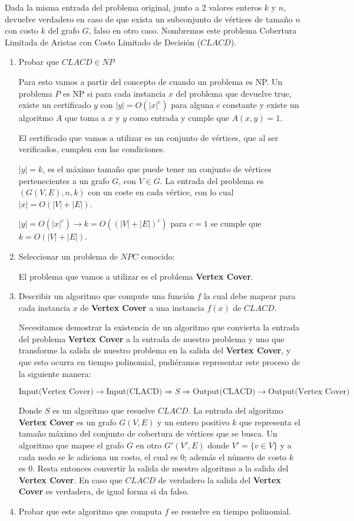 \documentclass{article}
\begin{document}
Dada la misma entrada del problema original, junto a 2 valores enteros $k$ y $n$, devuelve verdadero en caso de que exista un subconjunto de vértices de tamaño $n$ con costo $k$ del grafo $G$, falso en otro caso. Nombremos este problema Cobertura Limitada de Aristas con Costo Limitado de Decisión ($CLACD$).

\begin{enumerate}
  \item Probar que $CLACD \in NP$

    Para esto vamos a partir del concepto de cuando un problema es NP. Un problema $P$ es NP si para cada instancia $x$ del problema que devuelve true, existe un certificado $y$ con $|y|=O(|x|^c)$ para alguna $c$ constante y existe un algoritmo $A$ que toma a $x$ y $y$ como entrada y cumple que $A(x,y) = 1$.

    El certificado que vamos a utilizar es un conjunto de vértices, que al ser verificados, cumplen con las condiciones.

    $|y|=k$, es el máximo tamaño que puede tener un conjunto de vértices pertenecientes a un grafo $G$, con $V \in G$. La entrada del problema es $(G(V,E),n,k)$ con un coste en cada vértice, con lo cual $|x| = O(|V|+|E|)$.

    $|y|=O(|x|^c) \rightarrow k = O((|V|+|E|)^c)$ para $c=1$ se cumple que $k=O(|V|+|E|)$.
  \item Seleccionar un problema de $NPC$ conocido:

    El problema que vamos a utilizar es el problema \textbf{Vertex Cover}.
  \item Describir un algoritmo que compute una función $f$ la cual debe mapear para cada instancia $x$ de \textbf{Vertex Cover} a una instancia $f(x)$ de $CLACD$.

    Necesitamos demostrar la existencia de un algoritmo que convierta la entrada del problema \textbf{Vertex Cover} a la entrada de nuestro problema y uno que transforme la salida de nuestro problema en la salida del \textbf{Vertex Cover}, y que esto ocurra en tiempo polinomial, pudiéramos representar este proceso de la siguiente manera:

    \[
    \text{Input(Vertex Cover)} \rightarrow \text{Input(CLACD)} \Longrightarrow S \Longrightarrow \text{Output(CLACD)} \rightarrow \text{Output(Vertex Cover)}
    \]

    Donde $S$ es un algoritmo que resuelve $CLACD$. La entrada del algoritmo \textbf{Vertex Cover} es un grafo $G(V,E)$ y un entero positivo $k$ que representa el tamaño máximo del conjunto de cobertura de vértices que se busca. Un algoritmo que mapee el grafo $G$ en otro $G'(V',E)$ donde $V'=\{v \in V\}$ y a cada nodo se le adiciona un costo, el cual es 0; además el número de costo $k$ es 0. Resta entonces convertir la salida de nuestro algoritmo a la salida del \textbf{Vertex Cover}. En caso que $CLACD$ de verdadero la salida del \textbf{Vertex Cover} es verdadera, de igual forma si da falso.
  \item Probar que este algoritmo que computa $f$ se resuelve en tiempo polinomial.


\end{enumerate}
\end{document}
